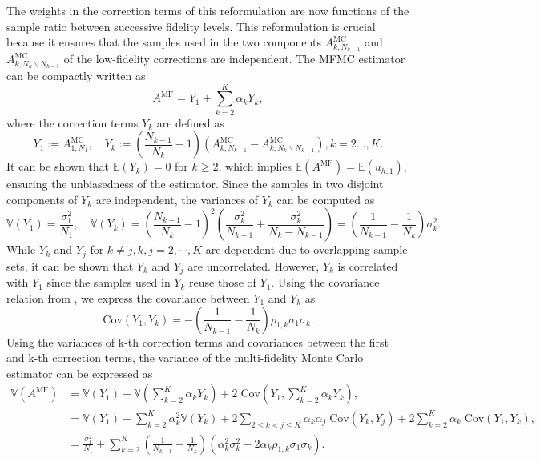 %
The weights in the correction terms of this reformulation  are now functions of the sample ratio between successive fidelity levels. This reformulation is crucial because it ensures that the samples used in  the two components $A_{k,N_{k-1}}^{\text{MC}}$ and $A_{k,N_k\backslash N_{k-1}}^{\text{MC}}$ of the low-fidelity corrections are independent. The MFMC estimator can be compactly written as
%
\[
A^{\text{MF}} = Y_1 + \sum_{k=2}^K \alpha_k Y_k,
\]
%
where the correction terms $Y_k$ are defined as
%
\[
Y_1 :=A^{\text{MC}}_{1,N_1},\quad Y_k:=\left(\frac{N_{k-1}}{N_{k}}-1\right)\left(A_{k,N_{k-1}}^{\text{MC}}- A_{k,N_k\backslash N_{k-1}}^{\text{MC}}\right), k=2\ldots, K.
\]
%
It can be shown that $\mathbb{E}(Y_k) = 0$ for $k\ge 2$, which implies $\mathbb{E}(A^{\text{MF}}) = \mathbb{E}(u_{h,1})$, ensuring the unbiasedness of the estimator. Since the samples in two disjoint components of $Y_k$ are independent, the variances of $Y_k$ can be computed as
%
\[
\mathbb{V}\left(Y_1\right) = \frac{\sigma_1^2}{N_1}, \quad \mathbb{V}\left(Y_k\right) = \left(\frac{N_{k-1}}{N_{k}}-1\right)^2\left(\frac{\sigma_k^2}{N_{k-1}}+\frac{\sigma_k^2}{N_k-N_{k-1}}\right) = \left(\frac{1}{N_{k-1}} - \frac{1}{N_k}\right)\sigma_k^2.
\]
%
While $Y_k$ and $Y_j$ for $k\neq j, k,j=2,\cdots, K$ are dependent due to overlapping sample sets, it can be shown that $Y_k$ and $Y_j$ are uncorrelated. However, $Y_k$  is correlated with $Y_1$ since the samples used in $Y_k$ reuse those of $Y_1$. Using the covariance relation from \cite[Lemma~3.2]{PeWiGu:2016}, we express the covariance between $Y_1$ and $Y_k$ as
%
\[
\text{Cov}(Y_1,Y_k) = - \left(\frac{1}{N_{k-1}} - \frac{1}{N_k}\right)\rho_{1,k}\sigma_1\sigma_k.
\]
%
Using the variances of k-th correction terms and covariances between the first and k-th correction terms, the variance of the multi-fidelity Monte Carlo estimator can be expressed as
%
\begin{align}
    \nonumber
    \mathbb{V}\left(A^{\text{MF}}\right) &= \mathbb{V}\left(Y_1\right) + \mathbb{V}\left(\sum_{k=2}^K \alpha_kY_k\right)+2\;\text{Cov}\left(Y_1,\sum_{k=2}^K \alpha_k Y_k \right),\\
    \nonumber
    &=\mathbb{V}\left(Y_1\right) + \sum_{k=2}^K \alpha_k^2 \mathbb{V}\left(Y_k\right)+2\sum_{2\le k<j\le K} \alpha_k\alpha_j\; \text{Cov}(Y_k,Y_j) +2\sum_{k=2}^K \alpha_k\;\text{Cov}\left(Y_1, Y_k\right),\\
    \label{eq:MFMC_variance}
    &=\frac{\sigma_1^2}{N_1} + \sum_{k=2}^K \left(\frac{1}{N_{k-1}} - \frac{1}{N_k}\right)\left(\alpha_k^2\sigma_k^2 - 2\alpha_k\rho_{1,k}\sigma_1\sigma_k\right).
\end{align}
